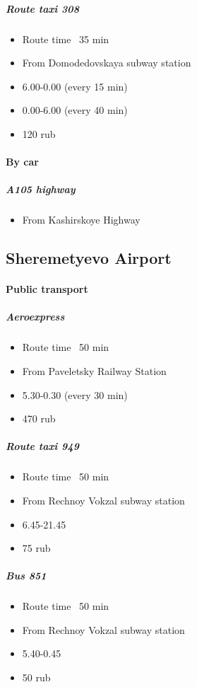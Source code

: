 \documentclass[10pt,fleqn,openany]{book} %
\begin{document}
\subparagraph{Route taxi 308}
\begin{itemize}
	\item Route time ~35 min
	\item From Domodedovskaya subway station
	\item 6.00-0.00 (every 15 min)
	\item 0.00-6.00 (every 40 min)
	\item 120 rub
\end{itemize}

\paragraph{By car}
\subparagraph{A105 highway}
\begin{itemize}
	\item From Kashirskoye Highway 
\end{itemize}

\subsection{Sheremetyevo Airport}
\paragraph{Public transport}

\subparagraph{Aeroexpress}
\begin{itemize}
	\item Route time ~50 min
	\item From Paveletsky Railway Station
	\item 5.30-0.30 (every 30 min)
	\item 470 rub
\end{itemize}

\subparagraph{Route taxi 949}
\begin{itemize}
	\item Route time ~50 min
	\item From Rechnoy Vokzal subway station
	\item 6.45-21.45
	\item 75 rub
\end{itemize}

\subparagraph{Bus 851}
\begin{itemize}
	\item Route time ~50 min
	\item From Rechnoy Vokzal subway station
	\item 5.40-0.45
	\item 50 rub
\end{itemize}
\end{document}
